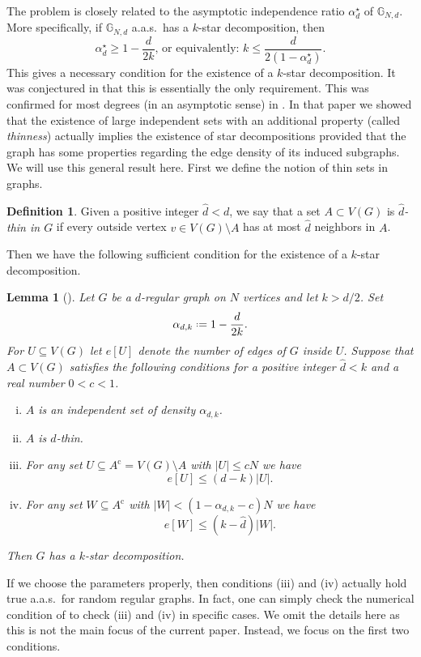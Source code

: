 \documentclass[12pt]{amsart}
\newtheorem{lemma}[theorem]{Lemma}
\theoremstyle{definition}
\newtheorem{definition}[theorem]{Definition}
\newcommand\Gb{\mathbb{G}}
\newcommand\dhat{\hat{d}}
\newcommand\comp{\mathrm{c}}
\newcommand\al{\alpha}
\newcommand\alstar{\alpha^{\star}}
\newcommand\sm{\setminus}
\newcommand{\defeq}{\mathrel{\vcenter{\baselineskip0.5ex \lineskiplimit0pt
                     \hbox{\scriptsize.}\hbox{\scriptsize.}}}%
                     =}
\begin{document}
The problem is closely related to the asymptotic independence ratio $\alstar_d$ of $\Gb_{N,d}$. More specifically, if $\Gb_{N,d}$ a.a.s.~has a $k$-star decomposition, then 
%
\[ \alstar_d \geq 1 - \frac{d}{2k} 
\text{, or equivalently: } 
k \leq \frac{d}{2(1-\alstar_d)} .
\]
%
This gives a necessary condition for the existence of a $k$-star decomposition. It was conjectured in \cite{delcourt2025decomposing} that this is essentially the only requirement. This was confirmed for most degrees (in an asymptotic sense) in \cite{harangi2025star1}. In that paper we showed that the existence of large independent sets with an additional property (called \emph{thinness}) actually implies the existence of star decompositions provided that the graph has some properties regarding the edge density of its induced subgraphs. We will use this general result here. First we define the notion of thin sets in graphs.
%
\begin{definition} \label{def:thin}
Given a positive integer $\dhat < d$, we say that a set $A \subset V(G)$ is \emph{$\dhat$-thin in $G$} if every outside vertex $v \in V(G) \sm A$ has at most $\dhat$ neighbors in $A$.
\end{definition}
%
Then we have the following sufficient condition for the existence of a $k$-star decomposition.
%
\begin{lemma}[\cite{harangi2025star1}] \label{lem:sd1}
Let $G$ be a $d$-regular graph on $N$ vertices and let $k>d/2$. Set 
%
\[ \al_{d,k} \defeq 1 - \frac{d}{2k} .\]
%
For $U \subseteq V(G)$ let $e[U]$ denote the number of edges of $G$ inside $U$. Suppose that $A \subset V(G)$ satisfies the following conditions for a positive integer $\dhat < k$ and a real number $0<c<1$.
%
\begin{enumerate}[(i)]
\item $A$ is an independent set of density $\al_{d,k}$.
\item $A$ is $\dhat$-thin.
\item For any set $U \subseteq A^\comp = V(G) \sm A$ with $|U|\leq cN$ we have
\[ e[U] \leq (d-k) |U| .\]
\item For any set $W \subseteq A^\comp$ with $|W| < (1-\al_{d,k}-c)N$ we have 
\[ e[W] \leq (k-\dhat) |W| .\]
\end{enumerate}
%
Then $G$ has a $k$-star decomposition.
\end{lemma}
%
If we choose the parameters properly, then conditions (iii) and (iv) actually hold true a.a.s.~for random regular graphs. In fact, one can simply check the numerical condition of \cite[Cor 3.4]{harangi2025star1} to check (iii) and (iv) in specific cases. We omit the details here as this is not the main focus of the current paper. Instead, we focus on the first two conditions.
\end{document}
